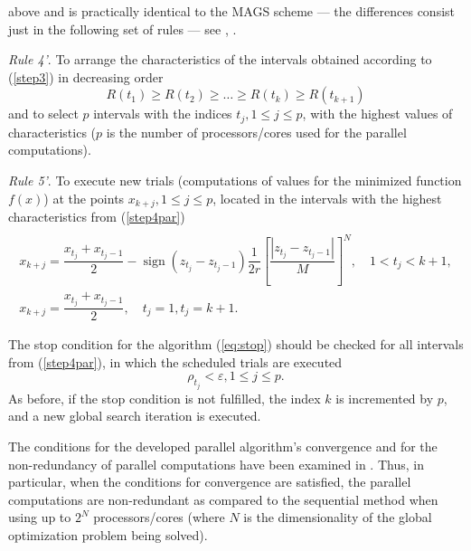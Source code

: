 \documentclass{gOMS2e}
\theoremstyle{plain}%
\theoremstyle{definition}
\DeclareMathOperator{\sign}{sign}
\theoremstyle{remark}
\begin{document}
above and is practically identical to the MAGS scheme --- the differences consist just in the
following set of rules --- see \cite{strSergGO}, \cite{stronginGergelBarkalovParGO}.
\par
\textit{Rule 4'}. To arrange the characteristics of the intervals obtained according to (\ref{step3}) in decreasing order
\begin{equation}
\label{step4par}
R(t_1)\geqslant R(t_2)\geqslant \dots \geqslant R(t_{k})\geqslant R(t_{k+1})
\end{equation}
and to select \(p\) intervals with the indices \(t_j,1\leqslant j\leqslant p\), with
the highest values of characteristics (\(p\) is the number of processors/cores used for the parallel computations).
\par
\textit{Rule 5'}. To execute new trials (computations of values for the minimized
function \(f(x)\)) at the points \(x_{k+j},1\leqslant j\leqslant p\), located in the
intervals with the highest characteristics from (\ref{step4par})
\begin{equation}
\label{step5par}
\begin{array}{cr}\\
x_{k+j}=\dfrac{x_{t_j}+x_{t_j-1}}{2}-\sign(z_{t_j}-z_{t_j-1})\dfrac{1}{2r}\left[\dfrac{|z_{t_j}-z_{t_j-1}|}{M}\right]^N,\quad 1<t_j<k+1, \\
x_{k+j}=\dfrac{x_{t_j}+x_{t_j-1}}{2},\quad t_j=1,t_j=k+1.
\end{array}
\end{equation}
\par
The stop condition for the algorithm (\ref{eq:stop}) should be checked for all
intervals from (\ref{step4par}), in which the scheduled trials are executed
\begin{equation}
  \label{eq:stop}
\rho_{t_j}<\varepsilon,1\leqslant j\leqslant p.
\end{equation}
As before, if the stop condition is not fulfilled, the index \(k\) is
incremented by \(p\), and a new global search iteration is executed.
\par
The conditions for the developed parallel algorithm’s convergence and for the
non-redundancy of parallel computations have been examined in \cite{strSergGO}.
Thus, in particular, when the conditions for convergence are satisfied, the parallel
computations are non-redundant as compared to the sequential method when using up to
\(2^N\) processors/cores (where \(N\) is the dimensionality of the global optimization problem being solved).
\end{document}
